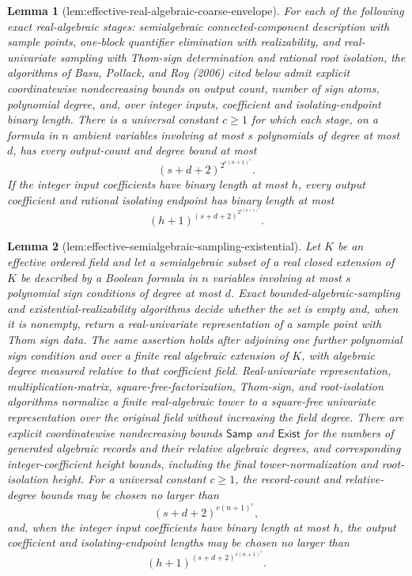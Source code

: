 \documentclass{article}
\newtheorem{lemma}{Lemma}
\begin{document}
\begin{lemma}[lem:effective-real-algebraic-coarse-envelope]\label{lem:effective-real-algebraic-coarse-envelope}
For each of the following exact real-algebraic stages: semialgebraic connected-component description with sample points, one-block quantifier elimination with realizability, and real-univariate sampling with Thom-sign determination and rational root isolation, the algorithms of Basu, Pollack, and Roy (2006) cited below admit explicit coordinatewise nondecreasing bounds on output count, number of sign atoms, polynomial degree, and, over integer inputs, coefficient and isolating-endpoint binary length.  There is a universal constant \(c\ge1\) for which each stage, on a formula in \(n\) ambient variables involving at most \(s\) polynomials of degree at most \(d\), has every output-count and degree bound at most
\[
 (s+d+2)^{2^{c(n+1)^c}}.                                  \tag{26a}
\]
If the integer input coefficients have binary length at most \(h\), every output coefficient and rational isolating endpoint has binary length at most
\[
 (h+1)^{(s+d+2)^{2^{c(n+1)^c}}}.                          \tag{26b}
\]
\end{lemma}

\begin{lemma}[lem:effective-semialgebraic-sampling-existential]\label{lem:effective-semialgebraic-sampling-existential}
Let \(K\) be an effective ordered field and let a semialgebraic subset of a real closed extension of \(K\) be described by a Boolean formula in \(n\) variables involving at most \(s\) polynomial sign conditions of degree at most \(d\). Exact bounded-algebraic-sampling and existential-realizability algorithms decide whether the set is empty and, when it is nonempty, return a real-univariate representation of a sample point with Thom sign data. The same assertion holds after adjoining one further polynomial sign condition and over a finite real algebraic extension of \(K\), with algebraic degree measured relative to that coefficient field. Real-univariate representation, multiplication-matrix, square-free-factorization, Thom-sign, and root-isolation algorithms normalize a finite real-algebraic tower to a square-free univariate representation over the original field without increasing the field degree. There are explicit coordinatewise nondecreasing bounds \(\mathsf{Samp}\) and \(\mathsf{Exist}\) for the numbers of generated algebraic records and their relative algebraic degrees, and corresponding integer-coefficient height bounds, including the final tower-normalization and root-isolation height. For a universal constant \(c\geq 1\), the record-count and relative-degree bounds may be chosen no larger than
\[
 (s+d+2)^{c(n+1)^c},
\]
and, when the integer input coefficients have binary length at most \(h\), the output coefficient and isolating-endpoint lengths may be chosen no larger than
\[
 (h+1)^{(s+d+2)^{c(n+1)^c}}.
\]
\end{lemma}
\end{document}
